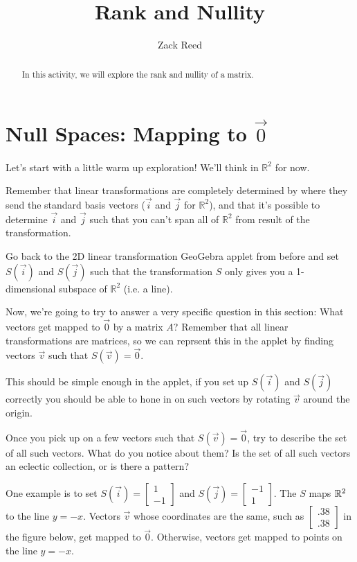 \documentclass{ximera}
\author{Zack Reed}
\title{Rank and Nullity}
\begin{document}
\begin{abstract}

In this activity, we will explore the rank and nullity of a matrix.

\end{abstract}
\maketitle

\section*{Null Spaces: Mapping to $\vec{0}$}

\begin{exploration}

    Let's start with a little warm up exploration! We'll think in $\mathbb{R}^2$ for now.
    
    Remember that linear transformations are completely determined by where they send the standard basis vectors ($\vec{i}$ and $\vec{j}$ for $\mathbb{R}^2$), and that it's possible to determine $\vec{i}$ and $\vec{j}$ such that you can't span all of $\mathbb{R}^2$ from result of the transformation.

    Go back to the 2D linear transformation GeoGebra applet from before and set $S(\vec{i})$ and $S(\vec{j})$ such that the transformation $S$ only gives you a 1-dimensional subspace of $\mathbb{R}^2$ (i.e. a line).
    

    Now, we're going to try to answer a very specific question in this section: What vectors get mapped to $\vec{0}$ by a matrix $A$? Remember that all linear transformations are matrices, so we can reprsent this in the applet by finding vectors $\vec{v}$ such that $S(\vec{v})=\vec{0}$.

    This should be simple enough in the applet, if you set up $S(\vec{i})$ and $S(\vec{j})$ correctly you should be able to hone in on such vectors by rotating $\vec{v}$ around the origin.

    Once you pick up on a few vectors such that $S(\vec{v})=\vec{0}$, try to describe the set of all such vectors. What do you notice about them? Is the set of all such vectors an eclectic collection, or is there a pattern?

    \begin{solution}

        One example is to set $S(\vec{i})=\begin{bmatrix} 1 \\ -1 \end{bmatrix}$ and $S(\vec{j})=\begin{bmatrix} -1 \\ 1 \end{bmatrix}$. The $S$ maps $\mathbb{R}^2$ to the line $y=-x$. Vectors $\vec{v}$ whose coordinates are the same, such as $\begin{bmatrix} .38 \\ .38 \end{bmatrix}$ in the figure below, get mapped to $\vec{0}$. Otherwise, vectors get mapped to points on the line $y=-x$. 


\end{solution}
\end{exploration}
\end{document}
